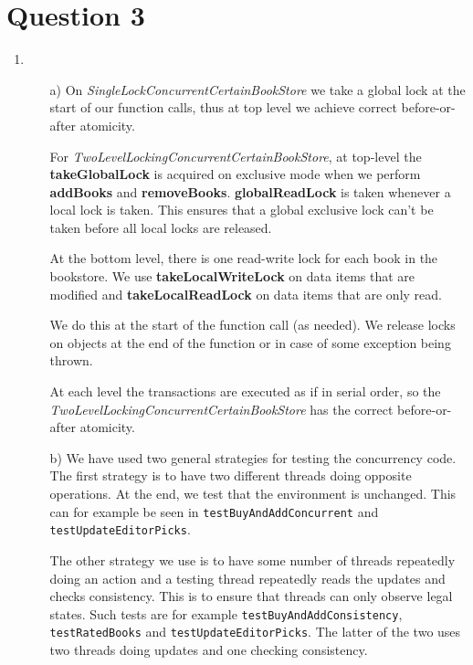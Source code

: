 \documentclass[11pt]{article}
\begin{document}
\section{Question 3}
\begin{enumerate}
	\item
		\begin{itemize}
		 \item[a)]
       On \textit{SingleLockConcurrentCertainBookStore} we take a global lock at
       the start of our function calls, thus at top level we achieve
       correct before-or-after atomicity.

       For \textit{TwoLevelLockingConcurrentCertainBookStore}, at top-level the
       \textbf{takeGlobalLock} is acquired on exclusive mode when we perform
       \textbf{addBooks} and \textbf{removeBooks}. \textbf{globalReadLock} is
       taken whenever a local lock is taken. This ensures that a global exclusive
       lock can't be taken before all local locks are released.

       At the bottom level, there is one read-write lock for each book in the
       bookstore. We use \textbf{takeLocalWriteLock} on data items that are modified and
       \textbf{takeLocalReadLock} on data items that are only read. 

       We do this at the start of the function call (as needed).
       We release locks on objects at the end of the function or in case of some
       exception being thrown. 

       At each level the transactions are executed as if in serial order, so the
       \textit{TwoLevelLockingConcurrentCertainBookStore} has the correct
       before-or-after atomicity.
		
		\item[b)]
      We have used two general strategies for testing the concurrency code. The
      first strategy is to have two different threads doing opposite operations.
      At the end, we test that the environment is unchanged. This can for
      example be seen in \verb|testBuyAndAddConcurrent| and
      \verb|testUpdateEditorPicks|.

      The other strategy we use is to have some number of threads repeatedly
      doing an action and a testing thread repeatedly reads the updates and
      checks consistency. This is to ensure that threads can only observe legal
      states. Such tests are for example \verb|testBuyAndAddConsistency|,
      \verb|testRatedBooks| and \verb|testUpdateEditorPicks|. The latter of the
      two uses two threads doing updates and one checking consistency.


\end{itemize}
\end{enumerate}
\end{document}
